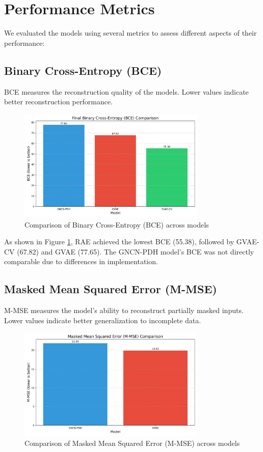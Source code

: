 \documentclass[11pt,a4paper]{article}
\begin{document}
\section{Performance Metrics}

We evaluated the models using several metrics to assess different aspects of their performance:

\subsection{Binary Cross-Entropy (BCE)}
BCE measures the reconstruction quality of the models. Lower values indicate better reconstruction performance.

\begin{figure}[H]
    \centering
    \includegraphics[width=0.8\textwidth]{comparison_results/bce_comparison.png}
    \caption{Comparison of Binary Cross-Entropy (BCE) across models}
    \label{fig:bce}
\end{figure}

As shown in Figure \ref{fig:bce}, RAE achieved the lowest BCE (55.38), followed by GVAE-CV (67.82) and GVAE (77.65). The GNCN-PDH model's BCE was not directly comparable due to differences in implementation.

\subsection{Masked Mean Squared Error (M-MSE)}
M-MSE measures the model's ability to reconstruct partially masked inputs. Lower values indicate better generalization to incomplete data.

\begin{figure}[H]
    \centering
    \includegraphics[width=0.8\textwidth]{comparison_results/mmse_comparison.png}
    \caption{Comparison of Masked Mean Squared Error (M-MSE) across models}
    \label{fig:mmse}
\end{figure}
\end{document}
